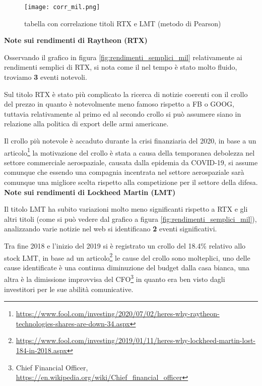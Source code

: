 \begin{figure}[h]
  \centering
  \texttt{[image: corr\_mil.png]}
  \caption{tabella con correlazione titoli RTX e LMT (metodo di Pearson)}
  \label{fig:corr_mill}
\end{figure}

\textbf{Note sui rendimenti di Raytheon (RTX)}

Osservando il grafico in figura \ref{fig:rendimenti_semplici_mil} relativamente ai rendimenti semplici di RTX, si nota come il nel tempo è
stato molto fluido, troviamo \textbf{3} eventi notevoli.

Sul titolo RTX è stato più complicato la ricerca di notizie coerenti con il crollo del prezzo in quanto è notevolmente meno famoso rispetto a FB o GOOG,
tuttavia relativamente al primo ed al secondo crollo si può assumere siano in relazione alla politica di export delle armi americane.

Il crollo più notevole è accaduto durante la crisi finanziaria del 2020, in base a un 
articolo\footnote{
  \href{https://www.fool.com/investing/2020/07/02/heres-why-raytheon-technologies-shares-are-down-34.aspx}{https://www.fool.com/investing/2020/07/02/heres-why-raytheon-technologies-shares-are-down-34.aspx}
}
la motivazione del crollo è stata a causa della temporanea debolezza nel settore commerciale aerospaziale, causata dalla epidemia da COVID-19,
si assume comunque che essendo una compagnia incentrata nel settore aerospaziale sarà comunque una migliore scelta rispetto alla competizione per il
settore della difesa.\\

\textbf{Note sui rendimenti di Lockheed Martin (LMT)}

Il titolo LMT ha subito variazioni molto meno significanti rispetto a RTX e gli altri titoli (come si può vedere dal grafico a figura \ref{fig:rendimenti_semplici_mil}), analizzando varie notizie nel web si identificano \textbf{2} eventi significativi.

Tra fine 2018 e l'inizio del 2019 si è registrato un crollo del 18.4\% relativo allo stock LMT, in base ad un 
articolo\footnote{
  \href{https://www.fool.com/investing/2019/01/11/heres-why-lockheed-martin-lost-184-in-2018.aspx}{https://www.fool.com/investing/2019/01/11/heres-why-lockheed-martin-lost-184-in-2018.aspx}
}
le cause del crollo sono molteplici, uno delle cause identificate è una continua diminuzione del budget dalla casa bianca, una altra è la dimissione improvvisa del 
CFO\footnote{
  Chief Financial Officer, \href{https://en.wikipedia.org/wiki/Chief_financial_officer}{https://en.wikipedia.org/wiki/Chief\_financial\_officer}
}
in quanto era ben visto dagli investitori per le sue abilità comunicative.

